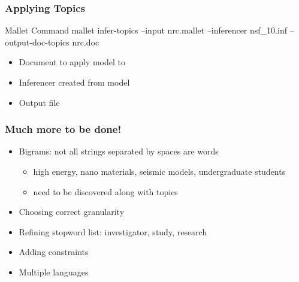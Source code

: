 \begin{frame}
  \frametitle{Applying Topics}
    \begin{block}{Mallet Command}
      mallet infer-topics --input \alert<2>{nrc.mallet} --inferencer \alert<3>{nsf\_10.inf} --output-doc-topics \alert<4>{nrc.doc}
    \end{block}

    \begin{itemize}
      \item Document to apply model to
      \item Inferencer created from model
      \item Output file
    \end{itemize}

\end{frame}

\begin{frame}
  \frametitle{Much more to be done!}

  \begin{itemize}
    \item Bigrams: not all strings separated by spaces are words
      \begin{itemize}
        \item high energy, nano materials, seismic models, undergraduate students
          \item need to be discovered along with topics
        \end{itemize}
        \item Choosing correct granularity
        \item Refining stopword list: investigator, study, research
        \item \alert<2>{Adding constraints}
        \item \alert<2>{Multiple languages}
   \end{itemize}

\end{frame}